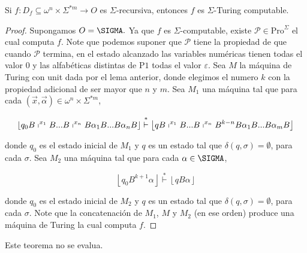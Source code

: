 	\begin{theorem}
		\PN Si $f: D_{f} \subseteq \omega^{n} \times \Sigma^{\ast m} \rightarrow O$ es $\Sigma$-recursiva, entonces $f$ es
    $\Sigma$-Turing computable.
  \end{theorem}
  \begin{proof}
    \PN Supongamos $O=\SIGMA.$ Ya que $f$ es $\Sigma $-computable, existe
    $ \mathcal{P}\in \mathrm{Pro}^{\Sigma }$ el cual computa $f$. Note que podemos suponer que $\mathcal{P}$ tiene la
    propiedad de que cuando $\mathcal{P}$ termina, en el estado alcanzado las variables numéricas tienen todas el valor
    $0$ y las alfabéticas distintas de $\mathrm{P}1$ todas el valor $ \varepsilon $. Sea $M$ la máquina de Turing con
    unit dada por el lema anterior, donde elegimos el numero $k$ con la propiedad adicional de ser mayor que $n$ y $m$.
    Sea $M_{1}$ una máquina tal que para cada $(\vec{x}, \vec{\alpha})\in \omega ^{n}\times \Sigma ^{\ast m}$,

  	\[
    \displaystyle \left\lfloor q_{0}B\shortmid ^{x_{1}}B...B\shortmid
    ^{x_{n}}B\alpha _{1}B...B\alpha _{n}B\right\rfloor \overset{\ast }{\vdash }\left\lfloor qB\shortmid
    ^{x_{1}}B...B\shortmid ^{x_{n}}B^{k-n}B\alpha _{1}B...B\alpha _{m}B\right\rfloor
  	\]

    donde $q_{0}$ es el estado inicial de $M_{1}$ y $q$ es un estado tal que $ \delta (q,\sigma )=\emptyset $, para cada
    $\sigma .$ Sea $M_{2}$ una máquina tal que para cada $\alpha \in \SIGMA$,

  	\[
    \displaystyle \left\lfloor q_{0}B^{k+1}\alpha \right\rfloor \overset{\ast }{\vdash } \left\lfloor qB\alpha \right\rfloor
  	\]

    donde $q_{0}$ es el estado inicial de $M_{2}$ y $q$ es un estado tal que $ \delta (q,\sigma )=\emptyset $, para cada
    $\sigma $. Note que la concatenación de $M_{1}$, $M$ y $M_{2}$ (en ese orden) produce una máquina de Turing la cual
    computa $f$.
	\end{proof}

  \begin{theorem}
    \PN Este teorema no se evalua.
  \end{theorem}
